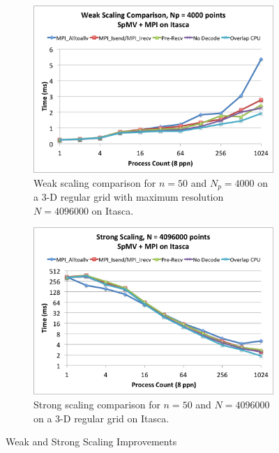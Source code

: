 \documentclass{report}
\begin{document}
\begin{figure}
\centering
\begin{subfigure}[t]{0.48\textwidth}
\centering
\includegraphics[width=\textwidth]{performance_content/scaling/weak_scaling_np4000_compare_SpMV_and_comm_n50.png}
\caption{Weak scaling comparison for $n=50$ and $N_p = 4000$ on a 3-D regular grid with maximum resolution $N=4096000$ on Itasca.}
\label{fig:compare_weak_scaling_n50}
\end{subfigure}
\quad
\begin{subfigure}[t]{0.48\textwidth}
\centering
\includegraphics[width=\textwidth]{performance_content/scaling/strong_scaling_4M_compare_SpMV_and_comm_n50.png}
\caption{Strong scaling comparison for $n=50$ and $N = 4096000$ on a 3-D regular grid on Itasca.}
\label{fig:compare_strong_scaling_n50}
\end{subfigure}
\caption{Weak and Strong Scaling Improvements}
\end{figure}
\end{document}
